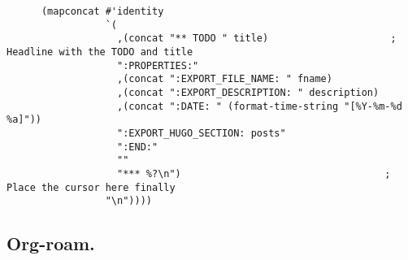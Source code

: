 \documentclass[11pt]{article}
\begin{document}
\begin{verbatim}
      (mapconcat #'identity
                 `(
                   ,(concat "** TODO " title)                     ; Headline with the TODO and title
                   ":PROPERTIES:"
                   ,(concat ":EXPORT_FILE_NAME: " fname)
                   ,(concat ":EXPORT_DESCRIPTION: " description)
                   ,(concat ":DATE: " (format-time-string "[%Y-%m-%d %a]"))
                   ":EXPORT_HUGO_SECTION: posts"
                   ":END:"
                   ""
                   "*** %?\n")                                   ; Place the cursor here finally
                 "\n"))))

\end{verbatim}
\subsection{Org-roam.}
\label{sec:org0114b05}
\end{document}
